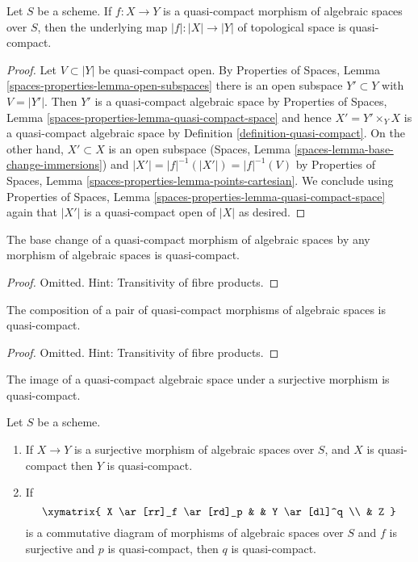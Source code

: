 \begin{lemma}
\label{lemma-quasi-compact-is-quasi-compact}
Let $S$ be a scheme. If $f : X \to Y$ is a quasi-compact morphism of
algebraic spaces over $S$, then the underlying map
$|f| : |X| \to |Y|$ of topological space is quasi-compact.
\end{lemma}

\begin{proof}
Let $V \subset |Y|$ be quasi-compact open. By Properties of Spaces,
Lemma \ref{spaces-properties-lemma-open-subspaces}
there is an open subspace $Y' \subset Y$ with $V = |Y'|$.
Then $Y'$ is a quasi-compact algebraic space by
Properties of Spaces, Lemma \ref{spaces-properties-lemma-quasi-compact-space}
and hence $X' = Y' \times_Y X$ is a quasi-compact algebraic
space by Definition \ref{definition-quasi-compact}.
On the other hand, $X' \subset X$ is an open subspace
(Spaces, Lemma \ref{spaces-lemma-base-change-immersions})
and $|X'| = |f|^{-1}(|X'|) = |f|^{-1}(V)$ by
Properties of Spaces, Lemma \ref{spaces-properties-lemma-points-cartesian}.
We conclude using
Properties of Spaces, Lemma \ref{spaces-properties-lemma-quasi-compact-space}
again that $|X'|$ is a quasi-compact open of $|X|$ as desired.
\end{proof}

\begin{lemma}
\label{lemma-base-change-quasi-compact}
The base change of a quasi-compact morphism of algebraic spaces
by any morphism of algebraic spaces is quasi-compact.
\end{lemma}

\begin{proof}
Omitted. Hint: Transitivity of fibre products.
\end{proof}

\begin{lemma}
\label{lemma-composition-quasi-compact}
The composition of a pair of quasi-compact morphisms of algebraic spaces
is quasi-compact.
\end{lemma}

\begin{proof}
Omitted. Hint: Transitivity of fibre products.
\end{proof}

\begin{lemma}
\label{lemma-surjection-from-quasi-compact}
\begin{slogan}
The image of a quasi-compact algebraic space under a surjective morphism
is quasi-compact.
\end{slogan}
Let $S$ be a scheme.
\begin{enumerate}
\item If $X \to Y$ is a surjective morphism of algebraic spaces over $S$,
and $X$ is quasi-compact then $Y$ is quasi-compact.
\item If
$$
\xymatrix{
X \ar[rr]_f \ar[rd]_p & &
Y \ar[dl]^q \\
& Z
}
$$
is a commutative diagram of morphisms of algebraic spaces over $S$
and $f$ is surjective and $p$ is quasi-compact, then $q$ is quasi-compact.
\end{enumerate}
\end{lemma}

